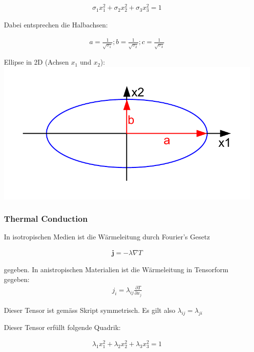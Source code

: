 \documentclass[a4paper]{scrartcl}
\begin{document}
\begin{align}
\sigma_1x_1^2+\sigma_2x_2^2+\sigma_3x_3^2=1
\end{align}


Dabei entsprechen die Halbachsen:

\begin{align}
a=\frac{1}{\sqrt{\sigma_1}}; b=\frac{1}{\sqrt{\sigma_2}};
c=\frac{1}{\sqrt{\sigma_3}}
\end{align}

\begin{center}
Ellipse in 2D (Achsen $x_1$ und $x_2$):\\
\includegraphics[scale=0.8]{images/quadrik_2d_ellipse.pdf}
\end{center}

\subsubsection{Thermal Conduction}
In isotropischen Medien ist die Wärmeleitung durch Fourier's Gesetz

\begin{align}
\mathbf{j}=-\lambda \nabla T
\end{align}

gegeben. In anistropischen Materialien ist die Wärmeleitung in Tensorform
gegeben:
\begin{align}
j_i=\lambda_{ij}\frac{\partial T}{\partial x_j}
\end{align}

Dieser Tensor ist gemäss Skript symmetrisch. Es gilt also
$\lambda_{ij}=\lambda_{ji}$

Dieser Tensor erfüllt folgende Quadrik:

\begin{align}
\lambda_1 x_1^2+\lambda_2 x_2^2+\lambda_3 x_3^2=1
\end{align}
\end{document}

